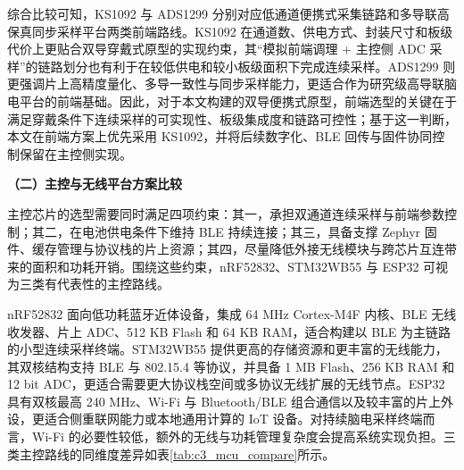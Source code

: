 综合比较可知，KS1092 与 ADS1299 分别对应低通道便携式采集链路和多导联高保真同步采样平台两类前端路线。KS1092 在通道数、供电方式、封装尺寸和板级代价上更贴合双导穿戴式原型的实现约束，其“模拟前端调理 + 主控侧 ADC 采样”的链路划分也有利于在较低供电和较小板级面积下完成连续采样。ADS1299 则更强调片上高精度量化、多导一致性与同步采样能力，更适合作为研究级高导联脑电平台的前端基础。因此，对于本文构建的双导便携式原型，前端选型的关键在于满足穿戴条件下连续采样的可实现性、板级集成度和链路可控性；基于这一判断，本文在前端方案上优先采用 KS1092，并将后续数字化、BLE 回传与固件协同控制保留在主控侧实现。

\noindent\textbf{（二）主控与无线平台方案比较}

主控芯片的选型需要同时满足四项约束：其一，承担双通道连续采样与前端参数控制；其二，在电池供电条件下维持 BLE 持续连接；其三，具备支撑 Zephyr 固件、缓存管理与协议栈的片上资源；其四，尽量降低外接无线模块与跨芯片互连带来的面积和功耗开销。围绕这些约束，nRF52832、STM32WB55 与 ESP32 可视为三类有代表性的主控路线。

nRF52832 面向低功耗蓝牙近体设备，集成 64 MHz Cortex-M4F 内核、BLE 无线收发器、片上 ADC、512 KB Flash 和 64 KB RAM，适合构建以 BLE 为主链路的小型连续采样终端\cite{nrf52832_nordic}。STM32WB55 提供更高的存储资源和更丰富的无线能力，其双核结构支持 BLE 与 802.15.4 等协议，并具备 1 MB Flash、256 KB RAM 和 12 bit ADC，更适合需要更大协议栈空间或多协议无线扩展的无线节点\cite{stm32wb55_st}。ESP32 具有双核最高 240 MHz、Wi-Fi 与 Bluetooth/BLE 组合通信以及较丰富的片上外设，更适合侧重联网能力或本地通用计算的 IoT 设备\cite{esp32_espressif}。对持续脑电采样终端而言，Wi-Fi 的必要性较低，额外的无线与功耗管理复杂度会提高系统实现负担。三类主控路线的同维度差异如表\ref{tab:c3_mcu_compare}所示。

